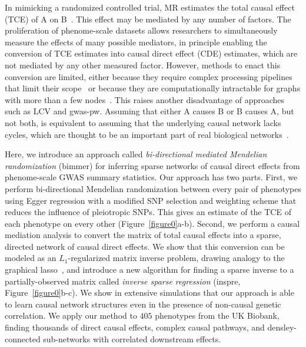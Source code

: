 \documentclass{article}
\begin{document}
In mimicking a randomized controlled trial, MR estimates the
total causal effect (TCE) of A on B~\cite{Burgess2015}. This effect may be mediated by
any number of factors. The proliferation of phenome-scale datasets
allows researchers to simultaneously measure the effects of many possible mediators,
in principle enabling the conversion of TCE estimates into causal direct effect (CDE)
estimates, which are not mediated by any other measured factor.
However, methods to enact this conversion are limited, either because they require complex
processing pipelines that limit their scope~\cite{Amar2019} or because they are
computationally intractable for graphs with more than a few nodes~\cite{Badsha2019}.
This raises another disadvantage of approaches such as LCV and gwas-pw. Assuming that either
A causes B or B causes A, but not both, is equivalent to assuming
that the underlying causal network
lacks cycles, which are thought to be an important part of real biological networks~\cite{Zhu2007}.

Here, we introduce an approach called
\emph{bi-directional mediated Mendelian randomization} (bimmer)
for inferring sparse networks of causal direct effects from phenome-scale
GWAS summary statistics.
Our approach has two parts. First, we perform bi-directional Mendelian randomization
between every pair of phenotypes using Egger regression with a
modified SNP selection and weighting scheme that reduces the
influence of pleiotropic SNPs.
This gives an estimate of the TCE of each phenotype on every other (Figure~\ref{figure0}a-b).
Second,
we perform a causal mediation analysis to convert the matrix
of total causal effects into a sparse, directed network of causal direct effects.
We show that this conversion can be modeled as an $L_1$-regularized matrix inverse problem,
drawing analogy to the graphical lasso~\cite{Friedman2007}, and introduce a new
algorithm for finding a sparse inverse to a partially-observed matrix called
\emph{inverse sparse regression} (inspre, Figure~\ref{figure0}b-c).
We show in extensive simulations that our approach is able to learn causal
 network structures even in the presence of non-causal genetic correlation.
We apply our method to $405$ phenotypes from the UK Biobank, finding thousands
 of direct causal effects, complex causal pathways, and densley-connected sub-networks
 with correlated downstream effects.
 
\end{document}
